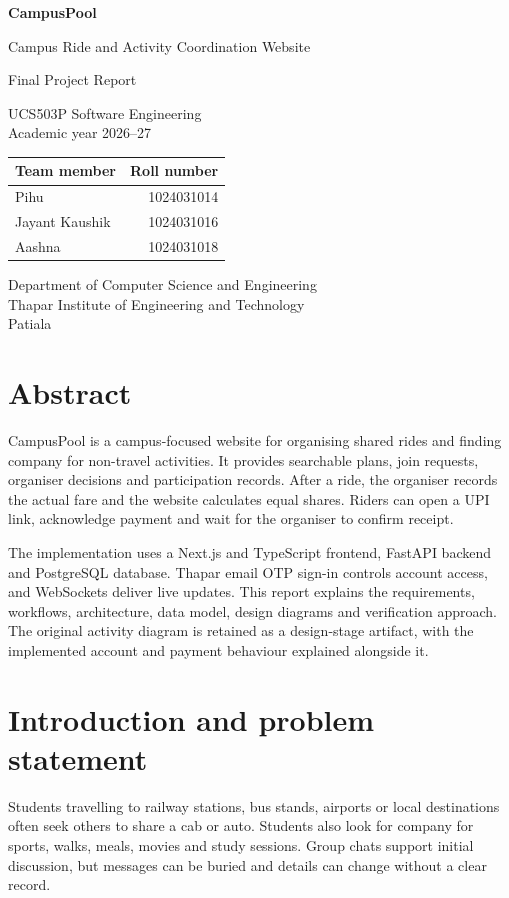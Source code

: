 \documentclass[11pt,a4paper]{article}
\begin{document}
\begin{titlepage}
\centering
\vspace*{24mm}
{\Huge\bfseries CampusPool\par}
\vspace{7mm}
{\Large Campus Ride and Activity Coordination Website\par}
\vspace{14mm}
{\Large Final Project Report\par}
\vspace{5mm}
UCS503P Software Engineering\\
Academic year 2026--27
\vspace{19mm}

\begin{tabular}{@{}lr@{}}
\toprule
\textbf{Team member} & \textbf{Roll number}\\
\midrule
Pihu & 1024031014\\
Jayant Kaushik & 1024031016\\
Aashna & 1024031018\\
\bottomrule
\end{tabular}
\vfill
Department of Computer Science and Engineering\\
Thapar Institute of Engineering and Technology\\
Patiala
\end{titlepage}
{\small\tableofcontents}
\clearpage

\section{Abstract}
CampusPool is a campus-focused website for organising shared rides and finding company for non-travel activities. It provides searchable plans, join requests, organiser decisions and participation records. After a ride, the organiser records the actual fare and the website calculates equal shares. Riders can open a UPI link, acknowledge payment and wait for the organiser to confirm receipt.

The implementation uses a Next.js and TypeScript frontend, FastAPI backend and PostgreSQL database. Thapar email OTP sign-in controls account access, and WebSockets deliver live updates. This report explains the requirements, workflows, architecture, data model, design diagrams and verification approach. The original activity diagram is retained as a design-stage artifact, with the implemented account and payment behaviour explained alongside it.

\section{Introduction and problem statement}
Students travelling to railway stations, bus stands, airports or local destinations often seek others to share a cab or auto. Students also look for company for sports, walks, meals, movies and study sessions. Group chats support initial discussion, but messages can be buried and details can change without a clear record.
\end{document}
